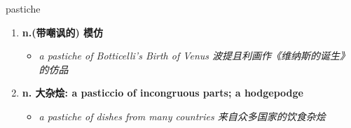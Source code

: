 
\begin{frame}
{\huge pastiche}
\begin{center}
\begin{enumerate}\Large
  \item \textbf{n.(带嘲讽的) 模仿}
  \begin{itemize}
    \item \em{\Large{a pastiche of Botticelli's Birth of Venus 波提且利画作《维纳斯的诞生》的仿品}}
  \end{itemize}
  \item \textbf{n. 大杂烩: a pasticcio of incongruous parts; a hodgepodge}
  \begin{itemize}
    \item \em{\Large{a pastiche of dishes from many countries 来自众多国家的饮食杂烩}}
  \end{itemize}
\end{enumerate}
\end{center}
\end{frame}
